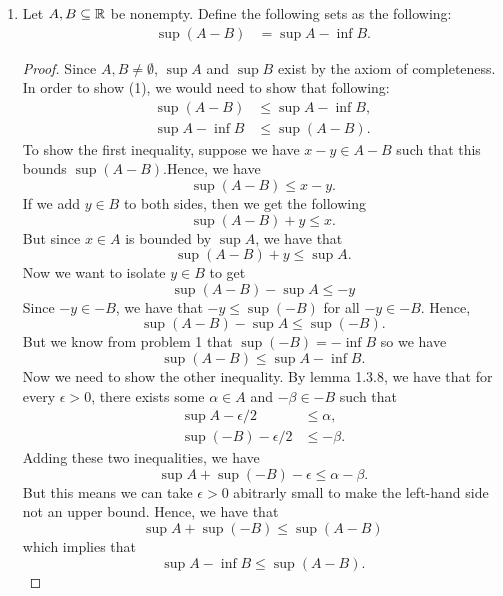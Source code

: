 \begin{enumerate}
\begin{proof}
        Now we want to show (2). We can do the same process as we did above and use lemma 1.3.8 to say that 
        for every \( \epsilon  > 0 \), we have that \[  - \beta \leq \inf (-A) + \epsilon \] for some 
        \( -\beta \in -A \). Multiplying by a negative again, we get that 
        \[ -\inf (-A) - \epsilon \leq \beta.\]
        Note that this is some \( \beta \in A \). So by lemma 1.3.8, we have that \( -\inf (-A) = \sup A \)
        and hence 
        \[ \inf (-A) = -\sup A.\]
        \end{proof}
\item 

Let \( A, B \subseteq \mathbb{R} \) be nonempty. Define the following sets as the following:
\begin{align*}
    \sup (A-B) &= \sup A - \inf B. 
\end{align*}

\begin{proof}
Since \( A, B \neq \emptyset \), \( \sup A \) and \( \sup B \) exist by the axiom of completeness.  
In order to show (1), we would need to show that following:
\begin{align*}
 \sup (A - B) &\leq \sup A - \inf B,  \\
 \sup A - \inf B &\leq \sup(A - B ). 
\end{align*}
To show the first inequality, suppose we have \( x - y  \in A - B \) such that this bounds \( \sup (A - B )\).Hence, we have 
\[ \sup (A - B) \leq x - y.\]
If we add \( y \in B \) to both sides, then we get the following 
\[ \sup (A - B) +y \leq x.\] But since \( x \in A \) is bounded by \( \sup A \), we have that 
\[ \sup ( A - B ) + y \leq \sup A.\] Now we want to isolate \( y \in B \) to get 
\[ \sup (A - B) - \sup A \leq -y\]
Since \( -y \in -B\), we have that \( -y \leq \sup (-B) \) for all \( -y \in -B \). Hence, 
\[ \sup (A - B ) - \sup A \leq \sup (-B). \] But we know from problem 1 that \( \sup (-B) = - \inf B \) so we have 
\[ \sup (A - B ) \leq \sup A - \inf B.\]
Now we need to show the other inequality. By lemma 1.3.8, we have that for every \( \epsilon > 0 \), there exists some \( \alpha \in A \) and \( -\beta \in -B \) such that 
\begin{align*}
\sup A - \epsilon/2 &\leq \alpha, \\
\sup (-B) - \epsilon/2 &\leq -\beta.
\end{align*}
Adding these two inequalities, we have 
\[ \sup A + \sup (-B) - \epsilon  \leq \alpha - \beta.\]
But this means we can take \( \epsilon > 0\) abitrarly small to make the left-hand side not an upper bound. Hence, we have that 
\[ \sup A + \sup (-B) \leq \sup (A - B)\] which implies that 
\[ \sup A - \inf B \leq \sup (A-B).\]
\end{proof}


\end{enumerate}
